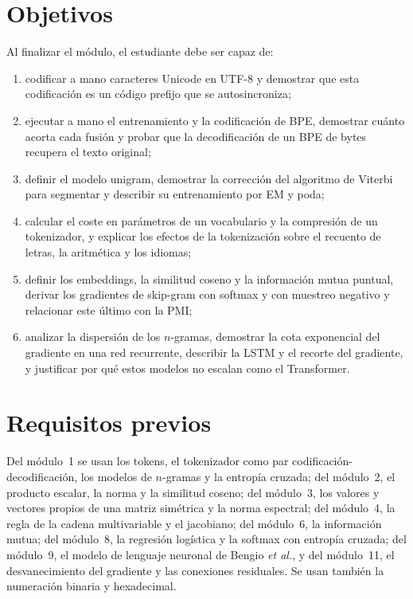 \documentclass[11pt,a4paper,twoside,openany]{book}
\begin{document}
\section*{Objetivos}
Al finalizar el módulo, el estudiante debe ser capaz de:
\begin{enumerate}[label=\arabic*.]
  \item codificar a mano caracteres Unicode en UTF-8 y demostrar que esta codificación es un código prefijo que se autosincroniza;
  \item ejecutar a mano el entrenamiento y la codificación de BPE, demostrar cuánto acorta cada fusión y probar que la decodificación de un BPE de bytes recupera el texto original;
  \item definir el modelo unigram, demostrar la corrección del algoritmo de Viterbi para segmentar y describir su entrenamiento por EM y poda;
  \item calcular el coste en parámetros de un vocabulario y la compresión de un tokenizador, y explicar los efectos de la tokenización sobre el recuento de letras, la aritmética y los idiomas;
  \item definir los embeddings, la similitud coseno y la información mutua puntual, derivar los gradientes de skip-gram con softmax y con muestreo negativo y relacionar este último con la PMI;
  \item analizar la dispersión de los $n$-gramas, demostrar la cota exponencial del gradiente en una red recurrente, describir la LSTM y el recorte del gradiente, y justificar por qué estos modelos no escalan como el Transformer.
\end{enumerate}

\section*{Requisitos previos}
Del módulo~1 se usan los tokens, el tokenizador como par codificación-decodificación, los modelos de $n$-gramas y la entropía cruzada; del módulo~2, el producto escalar, la norma y la similitud coseno; del módulo~3, los valores y vectores propios de una matriz simétrica y la norma espectral; del módulo~4, la regla de la cadena multivariable y el jacobiano; del módulo~6, la información mutua; del módulo~8, la regresión logística y la softmax con entropía cruzada; del módulo~9, el modelo de lenguaje neuronal de Bengio \emph{et al.}, y del módulo~11, el desvanecimiento del gradiente y las conexiones residuales. Se usan también la numeración binaria y hexadecimal.
\end{document}
